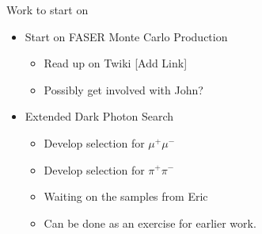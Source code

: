 \begin{frame}{Work to start on}
    \begin{itemize}
        \item Start on FASER Monte Carlo Production 
        \begin{itemize}
            \item Read up on Twiki [Add Link]
            \item Possibly get involved with John?
        \end{itemize}
        \item Extended Dark Photon Search
        \begin{itemize}
            \item Develop selection for $\mu^+ \mu^-$
            \item Develop selection for $\pi^+ \pi^-$
            \item Waiting on the samples from Eric
            \item Can be done as an exercise for earlier work. 
        \end{itemize}
    \end{itemize}
\end{frame}
